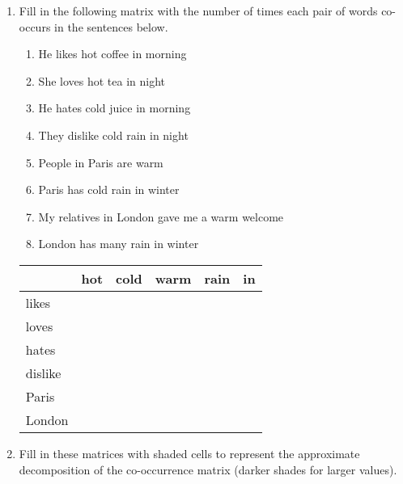 \documentclass[a4paper, 14pt]{extarticle}
\begin{document}
\begin{enumerate}[resume]
    \item Fill in the following matrix with the number of times each pair of words co-occurs in the sentences below.

{\small
\begin{multicols}{2}
\begin{enumerate}[label=\arabic*.,itemsep=0pt,parsep=0pt]
    \item He likes hot coffee in morning
    \item She loves hot tea in night
    \item He hates cold juice in morning
    \item They dislike cold rain in night
    \columnbreak
    \item People in Paris are warm
    \item Paris has cold rain in winter
    \item My relatives in London gave me a warm welcome
    \item London has many rain in winter
\end{enumerate}
\end{multicols}
}
\begin{center}
    \begin{tabular}{l|c|c|c|c|c}
          & hot & cold & warm & rain & in \\
\hline
likes     &   &    &    &    &  \\
\hline
loves     &   &    &    &    &  \\
\hline
hates     &   &    &    &    &  \\
\hline
dislike   &   &    &    &    &  \\
\hline
Paris     &   &    &    &    &  \\
\hline
London    &   &    &    &    &  \\
\end{tabular}
\end{center}

\item Fill in these matrices with shaded cells to represent the approximate decomposition of the co-occurrence matrix (darker shades for larger values).

\begin{center}
\end{center}
\end{enumerate}
\end{document}
